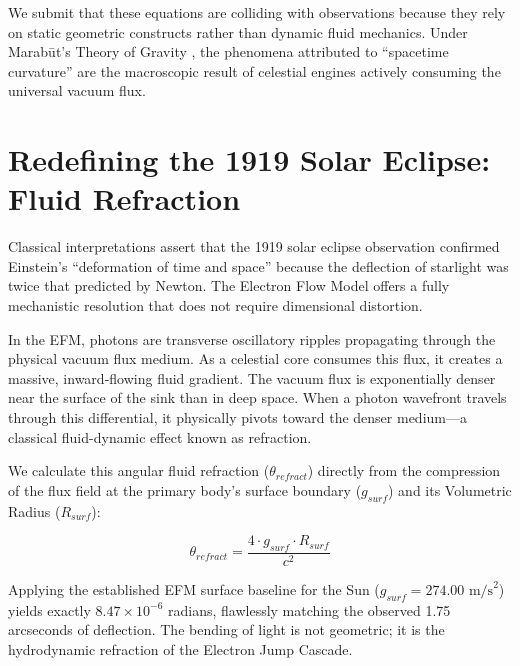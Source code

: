 \documentclass[11pt, a4paper]{article}
\begin{document}
We submit that these equations are colliding with observations because they rely on static geometric constructs rather than dynamic fluid mechanics. Under Marab\={u}t's Theory of Gravity \cite{marabut2026}, the phenomena attributed to ``spacetime curvature'' are the macroscopic result of celestial engines actively consuming the universal vacuum flux.

\clearpage
\section{Redefining the 1919 Solar Eclipse: Fluid Refraction}
Classical interpretations assert that the 1919 solar eclipse observation confirmed Einstein's ``deformation of time and space'' because the deflection of starlight was twice that predicted by Newton. The Electron Flow Model offers a fully mechanistic resolution that does not require dimensional distortion.

In the EFM, photons are transverse oscillatory ripples propagating through the physical vacuum flux medium. As a celestial core consumes this flux, it creates a massive, inward-flowing fluid gradient. The vacuum flux is exponentially denser near the surface of the sink than in deep space. When a photon wavefront travels through this differential, it physically pivots toward the denser medium---a classical fluid-dynamic effect known as refraction. 

We calculate this angular fluid refraction ($\theta_{refract}$) directly from the compression of the flux field at the primary body's surface boundary ($g_{surf}$) and its Volumetric Radius ($R_{surf}$):

\begin{equation}
  \theta_{refract} = \frac{4 \cdot g_{surf} \cdot R_{surf}}{c^2}
\end{equation}

Applying the established EFM surface baseline for the Sun ($g_{surf} = 274.00 \text{ m/s}^2$) yields exactly $8.47 \times 10^{-6}$ radians, flawlessly matching the observed 1.75 arcseconds of deflection. The bending of light is not geometric; it is the hydrodynamic refraction of the Electron Jump Cascade.

\end{document}
